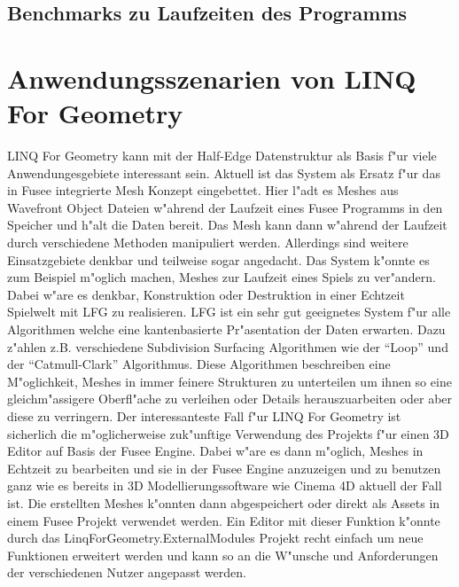 \documentclass[pagesize, paper=a4, fontsize=12pt,titlepage=true, headings=small, headnosepline, abstractoff, liststotoc, nochapterprefix, plainheadsepline]{scrreprt}
\newcommand{\LFG}{LINQ For Geometry}
\newcommand{\LFGS}{LINQ For Geometry }
\newcommand{\HES}{Half-Edge Datenstruktur }
\begin{document}
		\subsection {Benchmarks zu Laufzeiten des Programms}
	\section {Anwendungsszenarien von \LFG}
	\LFGS kann mit der \HES als Basis f"ur viele Anwendungesgebiete interessant sein. Aktuell ist das System als Ersatz f"ur das in Fusee integrierte Mesh Konzept eingebettet. Hier l"adt es Meshes aus Wavefront Object Dateien w"ahrend der Laufzeit eines Fusee Programms in den Speicher und h"alt die Daten bereit. Das Mesh kann dann w"ahrend der Laufzeit durch verschiedene Methoden manipuliert werden. Allerdings sind weitere Einsatzgebiete denkbar und teilweise sogar angedacht.
Das System k"onnte es zum Beispiel m"oglich machen, Meshes zur Laufzeit eines Spiels zu ver"andern. Dabei w"are es denkbar, Konstruktion oder Destruktion in einer Echtzeit Spielwelt mit LFG zu realisieren. LFG ist ein sehr gut geeignetes System f"ur alle Algorithmen welche eine kantenbasierte Pr"asentation der Daten erwarten. Dazu z"ahlen z.B. verschiedene Subdivision Surfacing Algorithmen wie der "`Loop"' und der "`Catmull-Clark"' Algorithmus. Diese Algorithmen beschreiben eine M"oglichkeit, Meshes in immer feinere Strukturen zu unterteilen um ihnen so eine gleichm"assigere Oberfl"ache zu verleihen oder Details herauszuarbeiten oder aber diese zu verringern.
Der interessanteste Fall f"ur \LFGS ist sicherlich die m"oglicherweise zuk"unftige Verwendung des Projekts f"ur einen 3D Editor auf Basis der Fusee Engine. Dabei w"are es dann m"oglich, Meshes in Echtzeit zu bearbeiten und sie in der Fusee Engine anzuzeigen und zu benutzen ganz wie es bereits in 3D Modellierungssoftware wie Cinema 4D aktuell der Fall ist. Die erstellten Meshes k"onnten dann abgespeichert oder direkt als Assets in einem Fusee Projekt verwendet werden. Ein Editor mit dieser Funktion k"onnte durch das LinqForGeometry.ExternalModules Projekt recht einfach um neue Funktionen erweitert werden und kann so an die W"unsche und Anforderungen der verschiedenen Nutzer angepasst werden.
\end{document}
